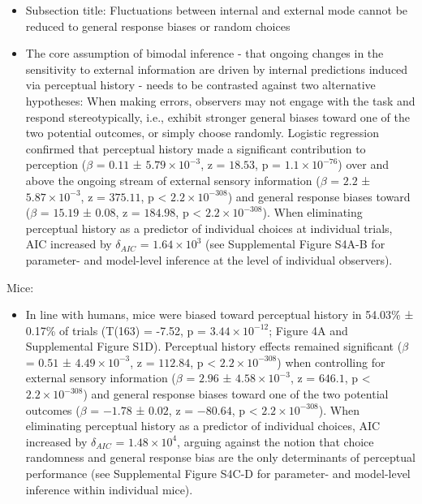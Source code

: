 \documentclass[
]{article}
\providecommand{\tightlist}{%
  \setlength{\itemsep}{0pt}\setlength{\parskip}{0pt}}
\begin{document}
\begin{itemize}
\item
  Subsection title: Fluctuations between internal and external mode
  cannot be reduced to general response biases or random choices
\item
  The core assumption of bimodal inference - that ongoing changes in the
  sensitivity to external information are driven by internal predictions
  induced via perceptual history - needs to be contrasted against two
  alternative hypotheses: When making errors, observers may not engage
  with the task and respond stereotypically, i.e., exhibit stronger
  general biases toward one of the two potential outcomes, or simply
  choose randomly. Logistic regression confirmed that perceptual history
  made a significant contribution to perception (\(\beta\) = \(0.11\) ±
  \(\ensuremath{5.79\times 10^{-3}}\), z = \(18.53\), p =
  \(\ensuremath{1.1\times 10^{-76}}\)) over and above the ongoing stream
  of external sensory information (\(\beta\) = \(2.2\) ±
  \(\ensuremath{5.87\times 10^{-3}}\), z = \(375.11\), p < \(\ensuremath{2.2\times 10^{-308}}\)) and
  general response biases toward (\(\beta\) = \(15.19\) ± \(0.08\), z =
  \(184.98\), p < \(\ensuremath{2.2\times 10^{-308}}\)). When eliminating perceptual history as a
  predictor of individual choices at individual trials, AIC increased by
  \(\delta_{AIC}\) = \(\ensuremath{1.64\times 10^{3}}\) (see
  Supplemental Figure S4A-B for parameter- and model-level inference at
  the level of individual observers).
\end{itemize}

Mice:

\begin{itemize}
\tightlist
\item
  In line with humans, mice were biased toward perceptual history in
  54.03\% ± 0.17\% of trials (T(163) = -7.52, p =
  \(\ensuremath{3.44\times 10^{-12}}\); Figure 4A and Supplemental
  Figure S1D). Perceptual history effects remained significant
  (\(\beta\) = \(0.51\) ± \(\ensuremath{4.49\times 10^{-3}}\), z =
  \(112.84\), p < \(\ensuremath{2.2\times 10^{-308}}\)) when controlling for external sensory
  information (\(\beta\) = \(2.96\) ±
  \(\ensuremath{4.58\times 10^{-3}}\), z = \(646.1\), p < \(\ensuremath{2.2\times 10^{-308}}\)) and
  general response biases toward one of the two potential outcomes
  (\(\beta\) = \(-1.78\) ± \(0.02\), z = \(-80.64\), p < \(\ensuremath{2.2\times 10^{-308}}\)). When
  eliminating perceptual history as a predictor of individual choices,
  AIC increased by \(\delta_{AIC}\) =
  \(\ensuremath{1.48\times 10^{4}}\), arguing against the notion that
  choice randomness and general response bias are the only determinants
  of perceptual performance (see Supplemental Figure S4C-D for
  parameter- and model-level inference within individual mice).
\end{itemize}
\end{document}
